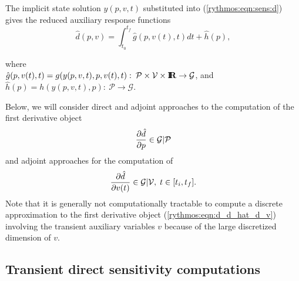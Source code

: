 \documentclass[pdf,ps2pdf,11pt]{SANDreport}
\begin{document}
The implicit state solution $y(p,v,t)$ substituted into
(\ref{rythmos:eqn:sens:d}) gives the reduced auxiliary response functions
%
\begin{equation}
\hat{d}(p,v)
= \int_{t_0}^{t_f} \hat{g}(p,v(t),t) dt + \hat{h}(p),
\label{rythmos:eqn:sens:d_hat}
\end{equation}
\begin{tabbing}
\hspace{4ex}where\hspace{1ex}\= \\
\>	$\hat{g}(p,v(t),t) = g(y(p,v,t),p,v(t),t) : \:
		\mathcal{P} \times \mathcal{V} \times \mbox{\textbf{I}}\hspace{-0.6ex}\mbox{\textbf{R}}	\rightarrow \mathcal{G}$, and \\
\>	$\hat{h}(p) = h(y(p,v,t),p) : \: \mathcal{P}	\rightarrow \mathcal{G}$.
\end{tabbing}

Below, we will consider direct and adjoint approaches to the computation of
the first derivative object
%
\begin{equation}
\displaystyle{\frac{\partial \hat{d}}{\partial p}} \in \mathcal{G}|\mathcal{P}
\label{rythmos:eqn:d_d_hat_d_p}
\end{equation}
%
and adjoint approaches for the computation of
%
\begin{equation}
\displaystyle{\frac{\partial \hat{d}}{\partial v(t)}} \in \mathcal{G}|\mathcal{V}, \; t \in [t_i,t_f].
\label{rythmos:eqn:d_d_hat_d_v}
\end{equation}
%
Note that it is generally not computationally tractable to compute a discrete
approximation to the first derivative object (\ref{rythmos:eqn:d_d_hat_d_v})
involving the transient auxiliary variables $v$ because of the large
discretized dimension of $v$.

\subsection{Transient direct sensitivity computations}
\label{rythmos:sec:direct-sens}
\end{document}
